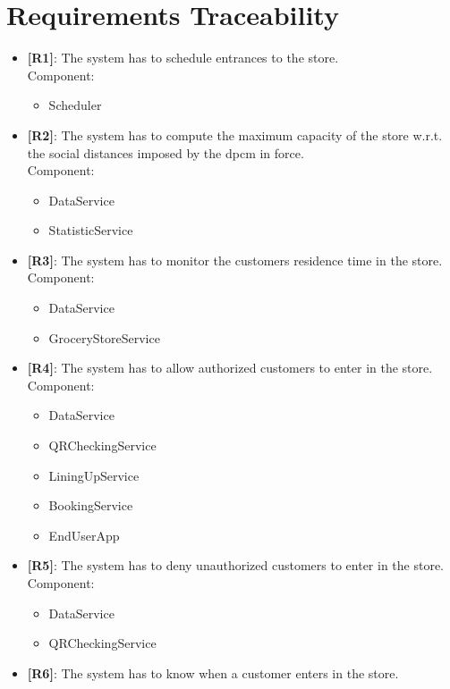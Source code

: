 \chapter{Requirements Traceability}
\begin{itemize}

    \item {\textbf{[R1]}}: The system has to schedule entrances to the store.\\
    Component:
    \begin{itemize}
        \item Scheduler
    \end{itemize}
    \item {\textbf{[R2]}}: The system has to compute the maximum capacity of the store w.r.t. the social distances imposed by the \gls{dpcm} in force.\\
    Component:
    \begin{itemize}
        \item DataService
        \item StatisticService
    \end{itemize}
    \item {\textbf{[R3]}}: The system has to monitor the customers residence time in the store.
    Component:
    \begin{itemize}
        \item DataService
        \item GroceryStoreService
    \end{itemize}
    \item {\textbf{[R4]}}: The system has to allow authorized customers to enter in the store.
    Component:
    \begin{itemize}
        \item DataService
        \item QRCheckingService
        \item LiningUpService
        \item BookingService
        \item EndUserApp
    \end{itemize}
    \item {\textbf{[R5]}}: The system has to deny unauthorized customers to enter in the store.
    Component:
    \begin{itemize}
        \item DataService
        \item QRCheckingService
    \end{itemize}
    \item {\textbf{[R6]}}: The system has to know when a customer enters in the store.

\end{itemize}
